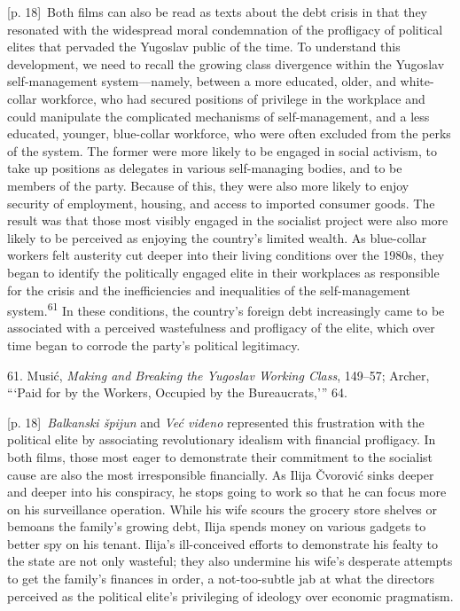 \documentclass[10pt,a4paper]{article}
\begin{document}
{\scriptsize\color{gray} [p. 18]}\ Both films can also be read as texts about the debt crisis in that they resonated with the widespread moral condemnation of the profligacy of political elites that pervaded the Yugoslav public of the time. To understand this development, we need to recall the growing class divergence within the Yugoslav self-management system—namely, between a more educated, older, and white-collar workforce, who had secured positions of privilege in the workplace and could manipulate the complicated mechanisms of self-management, and a less educated, younger, blue-collar workforce, who were often excluded from the perks of the system. The former were more likely to be engaged in social activism, to take up positions as delegates in various self-managing bodies, and to be members of the party. Because of this, they were also more likely to enjoy security of employment, housing, and access to imported consumer goods. The result was that those most visibly engaged in the socialist project were also more likely to be perceived as enjoying the country’s limited wealth. As blue-collar workers felt austerity cut deeper into their living conditions over the 1980s, they began to identify the politically engaged elite in their workplaces as responsible for the crisis and the inefficiencies and inequalities of the self-management system.\nobreak\textsuperscript{61} In these conditions, the country’s foreign debt increasingly came to be associated with a perceived wastefulness and profligacy of the elite, which over time began to corrode the party’s political legitimacy.\par{\small 61. Musić, \textit{Making and Breaking the Yugoslav Working Class}, 149–57; Archer, “‘Paid for by the Workers, Occupied by the Bureaucrats,’” 64.\par}
{\scriptsize\color{gray} [p. 18]}\ \textit{Balkanski špijun} and \textit{Već viđeno} represented this frustration with the political elite by associating revolutionary idealism with financial profligacy. In both films, those most eager to demonstrate their commitment to the socialist cause are also the most irresponsible financially. As Ilija Čvorović sinks deeper and deeper into his conspiracy, he stops going to work so that he can focus more on his surveillance operation. While his wife scours the grocery store shelves or bemoans the family’s growing debt, Ilija spends money on various gadgets to better spy on his tenant. Ilija’s ill-conceived efforts to demonstrate his fealty to the state are not only wasteful; they also undermine his wife’s desperate attempts to get the family’s finances in order, a not-too-subtle jab at what the directors perceived as the political elite’s privileging of ideology over economic pragmatism.\par
\end{document}
